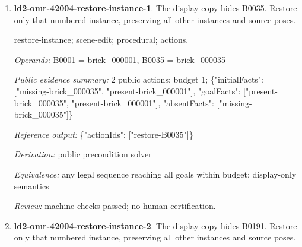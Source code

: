\begin{enumerate}
\par{\small source-sequence; scene-edit; procedural; actions.\par\textit{Operands:} B0007 = brick\_000007, B0010 = brick\_000010, B0012 = brick\_000012, B0002 = brick\_000002, B0013 = brick\_000013, B0003 = brick\_000003, B0011 = brick\_000011, B0001 = brick\_000001, B0008 = brick\_000008, B0004 = brick\_000004, B0005 = brick\_000005, B0006 = brick\_000006, B0014 = brick\_000014, B0009 = brick\_000009, B0015 = brick\_000015\par\textit{Public evidence summary:} 6 public actions; budget 6; \{"initialFacts": ["start"], "goalFacts": ["done-6"], "absentFacts": []\}\par\textit{Reference output:} \{"actionIds": ["step-1", "step-2", "step-3", "step-4", "step-5", "step-6"]\}\par\textit{Derivation:} public precondition solver\par\textit{Equivalence:} any legal sequence reaching all goals within budget; display-only semantics\par\textit{Review:} pending required human review.}
\item \textbf{ld2-omr-42004-restore-instance-1}. The display copy hides B0035. Restore only that numbered instance, preserving all other instances and source poses.
\par{\small restore-instance; scene-edit; procedural; actions.\par\textit{Operands:} B0001 = brick\_000001, B0035 = brick\_000035\par\textit{Public evidence summary:} 2 public actions; budget 1; \{"initialFacts": ["missing-brick\_000035", "present-brick\_000001"], "goalFacts": ["present-brick\_000035", "present-brick\_000001"], "absentFacts": ["missing-brick\_000035"]\}\par\textit{Reference output:} \{"actionIds": ["restore-B0035"]\}\par\textit{Derivation:} public precondition solver\par\textit{Equivalence:} any legal sequence reaching all goals within budget; display-only semantics\par\textit{Review:} machine checks passed; no human certification.}
\item \textbf{ld2-omr-42004-restore-instance-2}. The display copy hides B0191. Restore only that numbered instance, preserving all other instances and source poses.

\end{enumerate}
